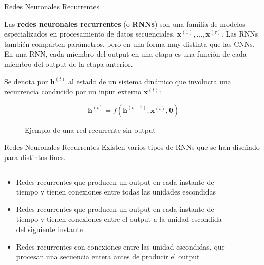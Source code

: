 \documentclass[9pt]{beamer}
\begin{document}
\begin{frame}{Redes Neuronales Recurrentes}

Las \textbf{redes neuronales recurrentes} (o \textbf{RNNs}) son una familia de modelos especializados en procesamiento de datos secuenciales, $\bm{x}^{(1)},...,\bm{x}^{(\tau)}$. Las RNNs también comparten parámetros, pero en una forma muy distinta que las CNNs. En una RNN, cada miembro del output en una etapa es una función de cada miembro del output de la etapa anterior. \pause

Se denota por $\bm{h}^{(t)}$ al estado de un sistema din\'amico que involucra una recurrencia conducido por un input externo $\bm{x}^{(t)}$:

\begin{equation*}
\bm{h}^{(t)} = f(\bm{h}^{(t-1)}; \bm{x}^{(t)}, \bm{\theta})
\end{equation*}
\pause

\begin{figure}[H]
\captionsetup{font=small,labelfont=small}
\caption{Ejemplo de una red recurrente sin output \cite{Goodfellow-et-al-2016}}
\centering
{}
\end{figure}

\end{frame}

\begin{frame}{Redes Neuronales Recurrentes}
Existen varios tipos de RNNs que se han diseñado para distintos fines. \pause

\begin{columns}
  \begin{column}{0.5\textwidth}
    \begin{itemize}
      \item Redes recurrentes que producen un output en cada instante de tiempo y tienen conexiones entre todas las unidades escondidas \pause
      \item Redes recurrentes que producen un output en cada instante de tiempo y tienen conexiones entre el output a la unidad escondida del siguiente instante \pause
      \item Redes recurrentes con conexiones entre las unidad escondidas, que procesan una secuencia entera antes de producir el output \pause
    \end{itemize}

  \end{column}

  \begin{column}{0.5\textwidth}

    \begin{figure}[H]
    \captionsetup{font=small,labelfont=small}
    \centering
    \end{figure}

  \end{column}

\end{columns}


\end{frame}
\end{document}
